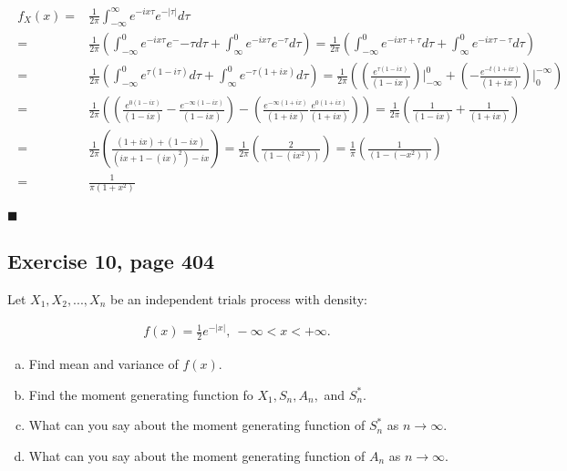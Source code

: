 \documentclass{article}
\begin{document}
\begin{eqnarray}
\label{eqcauchi}
\begin{split}
f_X(x) = &\frac{1}{2\pi} \int_{-\infty}^{\infty} e^{-ix\tau} e^{-\lvert\tau\rvert} d\tau \\
= & \frac{1}{2\pi} \left( \int_{-\infty}^{0}e^{-ix\tau} e^-{-\tau} d\tau + \int_{\infty}^{0}e^{-ix\tau} e^{-\tau} d\tau \right)
= \frac{1}{2\pi} \left( \int_{-\infty}^{0} e^{-ix\tau+\tau} d\tau + \int_{\infty}^{0} e^{-ix\tau-\tau} d\tau \right)\\
= & \frac{1}{2\pi} \left( \int_{-\infty}^{0} e^{\tau(1-i\tau)}d\tau + \int_{\infty}^{0} e^{-\tau(1 + ix)}d\tau\right)
= \frac{1}{2\pi} \left( \left(\frac{e^{\tau(1-ix)}}{(1-ix)}\right) \Bigr \rvert_{-\infty}^0  + \left( - \frac{e^{-t(1 + ix)}}{(1 + ix)} \right) \Bigr \rvert_{0}^{-\infty}\right)\\
= & \frac{1}{2\pi} \left( \left( \frac{e^{0(1-ix)}}{(1-ix)} - \frac{e^{-\infty(1-ix)}}{(1-ix)} \right ) - \left( \frac{e^{-\infty(1 + ix)}}{(1 + ix)} \frac{e^{0(1 + ix)}}{(1 + ix)} \right) \right)
= \frac{1}{2\pi} \left( \frac{1}{(1-ix)} + \frac{1}{(1 + ix)} \right)\\
= & \frac{1}{2\pi} \left( \frac{(1 + ix) +  (1 - ix)}{(ix + 1 - (ix)^2) - ix} \right)
=\frac{1}{2\pi} \left( \frac{2}{(1-(ix^2))} \right) = \frac{1}{\pi} \left( \frac{1}{(1- (-x^2))} \right)\\
= & \frac{1}{\pi(1+x^2)}
\end{split}
\end{eqnarray}
\begin{flushright}
$\blacksquare$
\end{flushright}

\subsection{Exercise 10, page 404}

Let $X_1, X_2, ... , X_n$ be an independent trials process with density:

 \begin{eqnarray*}
\label{equation3}
f(x) = \frac{1}{2} e^{-\lvert x \rvert}, \: -\infty < x < + \infty.
\end{eqnarray*}

\begin{enumerate}[(a)]
\item Find mean and variance of $f(x)$.
\item Find the moment generating function fo $X_1, S_n, A_n, $ and $S^{*}_n$.
\item What can you say about the moment generating function of $S^{*}_n$ as $n \rightarrow \infty$.
\item What can you say about the moment generating function of $A_n$ as $n \rightarrow \infty$.
\end{enumerate}
\end{document}
